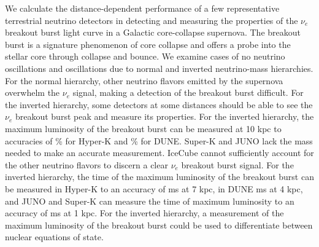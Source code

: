We calculate the distance-dependent performance of a few representative terrestrial 
neutrino detectors in detecting and measuring the properties of the $\nu_e$
breakout 
burst light curve in a Galactic core-collapse supernova. The breakout 
burst is a signature phenomenon of core collapse and offers a probe
into 
the stellar core through collapse and bounce. We examine cases of 
no neutrino oscillations and oscillations due to normal and inverted 
neutrino-mass hierarchies. For the normal hierarchy, other neutrino 
flavors emitted by the supernova overwhelm the $\nu_e$ signal, making a 
detection of the breakout burst difficult. For the inverted hierarchy, 
some detectors at some distances should be able to see the $\nu_e$ breakout 
burst peak and measure its properties. For the inverted hierarchy, the 
maximum luminosity of the breakout burst can be measured at 10 kpc to 
accuracies of \% for Hyper-K and \% for DUNE. Super-K and JUNO lack 
the mass needed to make an accurate measurement. 
IceCube cannot sufficiently account for the other neutrino flavors 
to discern a clear $\nu_e$ breakout burst signal. For the inverted
hierarchy, 
the time of the maximum luminosity of the breakout burst can be
measured 
in Hyper-K to an accuracy of  ms at 7 kpc, in DUNE  ms at 4 kpc, 
and JUNO and Super-K can measure the time of maximum luminosity to 
an accuracy of  ms at 1 kpc. For the inverted hierarchy, a 
measurement of the maximum luminosity of the breakout burst could 
be used to differentiate between nuclear equations of state. 
